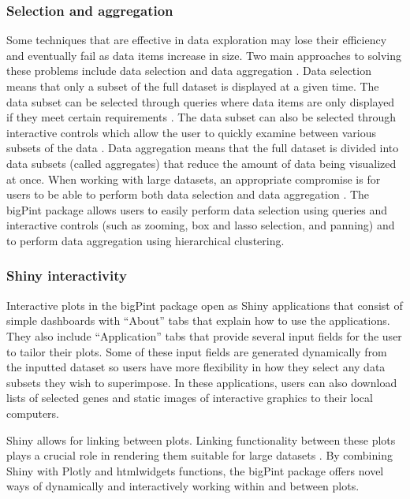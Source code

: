 \documentclass{bmcart}
\begin{document}
\subsubsection*{Selection and aggregation}

Some techniques that are effective in data exploration may lose their efficiency and eventually fail as data items increase in size. Two main approaches to solving these problems include data selection and data aggregation \cite{andrienko2005blending}. Data selection means that only a subset of the full dataset is displayed at a given time. The data subset can be selected through queries where data items are only displayed if they meet certain requirements \cite{andrienko2005blending}. The data subset can also be selected through interactive controls which allow the user to quickly examine between various subsets of the data \cite{andrienko2005blending}. Data aggregation means that the full dataset is divided into data subsets (called aggregates) that reduce the amount of data being visualized at once. When working with large datasets, an appropriate compromise is for users to be able to perform both data selection and data aggregation \cite{andrienko2005blending}. The bigPint package allows users to easily perform data selection using queries and interactive controls (such as zooming, box and lasso selection, and panning) and to perform data aggregation using hierarchical clustering. 

\subsubsection*{Shiny interactivity}

Interactive plots in the bigPint package open as Shiny applications that consist of simple dashboards with ``About'' tabs that explain how to use the applications. They also include ``Application'' tabs that provide several input fields for the user to tailor their plots. Some of these input fields are generated dynamically from the inputted dataset so users have more flexibility in how they select any data subsets they wish to superimpose. In these applications, users can also download lists of selected genes and static images of interactive graphics to their local computers. 

Shiny allows for linking between plots. Linking functionality between these plots plays a crucial role in rendering them suitable for large datasets \cite{nguyen2016deep, albuquerque2009quality, heinrich2012parallel}. By combining Shiny with Plotly and htmlwidgets functions, the bigPint package offers novel ways of dynamically and interactively working within and between plots.
\end{document}
